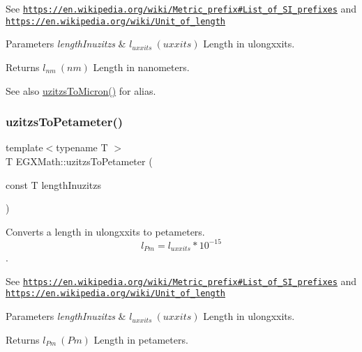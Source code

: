 See \href{https://en.wikipedia.org/wiki/Metric_prefix#List_of_SI_prefixes}{\tt https\+://en.\+wikipedia.\+org/wiki/\+Metric\+\_\+prefix\#\+List\+\_\+of\+\_\+\+S\+I\+\_\+prefixes} and \href{https://en.wikipedia.org/wiki/Unit_of_length}{\tt https\+://en.\+wikipedia.\+org/wiki/\+Unit\+\_\+of\+\_\+length} 
\begin{DoxyParams}{Parameters}
{\em length\+Inuzitzs} & $ l_{uxxits}\ (uxxits)$ Length in ulongxxits. \\
\hline
\end{DoxyParams}
\begin{DoxyReturn}{Returns}
$ l_{nm}\ (nm)$ Length in nanometers. 
\end{DoxyReturn}
\begin{DoxySeeAlso}{See also}
\mbox{\hyperlink{group___e_g_x_math-_conversions-_length_conversions-uzitzs-_non-_s_i_ga695a8fd8870537930d6378e99ad2aa9f}{uzitzs\+To\+Micron()}} for alias. 
\end{DoxySeeAlso}
\mbox{\label{group___e_g_x_math-_conversions-_length_conversions-uzitzs-_s_i_gafe93d0226789fd78c2ffa4223eb6af7b}} 
\subsubsection{\texorpdfstring{uzitzs\+To\+Petameter()}{uzitzsToPetameter()}}
{\footnotesize\ttfamily template$<$typename T $>$ \\
T E\+G\+X\+Math\+::uzitzs\+To\+Petameter (\begin{DoxyParamCaption}\item[{const T}]{length\+Inuzitzs }\end{DoxyParamCaption})}



Converts a length in ulongxxits to petameters. \[ l_{Pm}=l_{uxxits} * 10^{-15} \]. 

See \href{https://en.wikipedia.org/wiki/Metric_prefix#List_of_SI_prefixes}{\tt https\+://en.\+wikipedia.\+org/wiki/\+Metric\+\_\+prefix\#\+List\+\_\+of\+\_\+\+S\+I\+\_\+prefixes} and \href{https://en.wikipedia.org/wiki/Unit_of_length}{\tt https\+://en.\+wikipedia.\+org/wiki/\+Unit\+\_\+of\+\_\+length} 
\begin{DoxyParams}{Parameters}
{\em length\+Inuzitzs} & $ l_{uxxits}\ (uxxits)$ Length in ulongxxits. \\
\hline
\end{DoxyParams}
\begin{DoxyReturn}{Returns}
$ l_{Pm}\ (Pm)$ Length in petameters. 
\end{DoxyReturn}
\mbox{\label{group___e_g_x_math-_conversions-_length_conversions-uzitzs-_s_i_ga48c60a4876ac426d1717096263648a4d}} 
